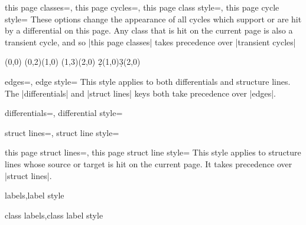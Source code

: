 \documentclass{ltxdoc}
\begin{document}
\begin{sseqdata}[name=ex1,degree={#1}{1-#1}]
\begin{keylist}{this page classes=, this page cycles=, this page class style=, this page cycle style=}
These options change the appearance of all cycles which support or are hit by a differential on this page. Any class that is hit on the current page is also a transient cycle, and so |this page classes| takes precedence over |transient cycles|
\begin{codeexample}[width=6cm]
\begin{sseqdata}[name=this page cycles example,Adams grading,
                 transient cycles={red,fill},this page cycles={blue}]
\class(0,0)
\class(0,2)\class(1,0)
\class(1,3)\class(2,0)
\d2(1,0)\d3(2,0)
\end{sseqdata}
\printpage[name=this page cycles example,page=2]
\hskip1cm
\printpage[name=this page cycles example,page=3]
\end{codeexample}
\end{keylist}

\begin{keylist}{edges=, edge style=}
This style applies to both differentials and structure lines. The |differentials| and |struct lines| keys both take precedence over |edges|.
\end{keylist}

\begin{keylist}{differentials=, differential style=}

\end{keylist}

\begin{keylist}{struct lines=, struct line style=}

\end{keylist}

\begin{keylist}{this page struct lines=, this page struct line style=}
This style applies to structure lines whose source or target is hit on the current page. It takes precedence over |struct lines|.
\end{keylist}

\begin{keylist}{labels,label style}

\end{keylist}

\begin{keylist}{class labels,class label style}

\end{keylist}


\end{sseqdata}
\end{document}
